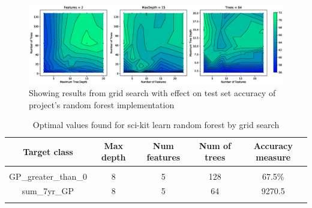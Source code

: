 \documentclass{article} %
\begin{document}
\begin{figure}[ht]
\includegraphics[width=1.1\textwidth]{gridSClass}
\caption{Showing results from grid search with effect on test set accuracy of project's random forest implementation}
\label{fig:gridSClass}
\end{figure}

\begin{table}[h]
\caption{Optimal values found for sci-kit learn random forest by grid search}
\begin{center}
\begin{tabular}{ccccc}
{\bf Target class} &{\bf Max depth} &{\bf Num features} &{\bf Num of trees}&{\bf Accuracy measure}
\\ \hline \\
GP\_greater\_than\_0         &8	&5 &128 &67.5\%\\
sum\_7yr\_GP         &8	&5 &64 &9270.5\\
\label{scikit-table}
\end{tabular}
\end{center}
\end{table}
\end{document}
